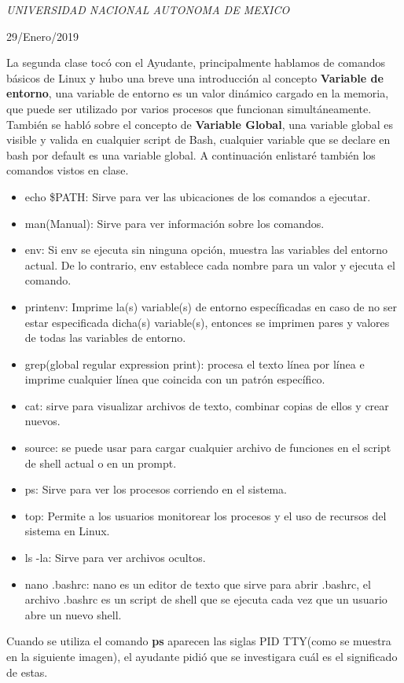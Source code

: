\documentclass[a4paper, 11pt, oneside]{article}
\begin{document}
\begin{titlepage}
	\textit{UNIVERSIDAD NACIONAL AUTONOMA DE MEXICO} 
	
	\vfill
	
	
	
	
	\vspace{0.3\baselineskip} 
	
	29/Enero/2019 
	
	 

\end{titlepage}

La segunda clase tocó con el Ayudante, principalmente hablamos de comandos básicos de Linux y hubo una breve una introducción al concepto \textbf{Variable de entorno}, una variable de entorno es un valor dinámico cargado en la memoria, que puede ser utilizado por varios procesos que funcionan simultáneamente. También se habló sobre el concepto de \textbf{Variable Global}, una variable global es visible y valida en cualquier script de Bash, cualquier variable que se declare en bash por default es una variable global. A continuación enlistaré también los comandos vistos en clase. 

\begin{itemize}
 \item echo \$PATH: Sirve para ver las ubicaciones de los comandos a ejecutar.
 \item man(Manual): Sirve para ver información sobre los comandos.
 \item env: Si env se ejecuta sin ninguna opción, muestra las variables del entorno actual. De lo contrario, env establece cada nombre para un valor y ejecuta el comando.
 \item printenv: Imprime la(s) variable(s) de entorno específicadas en caso de no ser estar especificada dicha(s) variable(s), entonces se imprimen pares y valores de todas las variables de entorno.
 \item grep(global regular expression print): procesa el texto línea por línea e imprime cualquier línea que coincida con un patrón específico.
 \item cat: sirve para visualizar archivos de texto, combinar copias de ellos y crear nuevos.
 \item source: se puede usar para cargar cualquier archivo de funciones en el script de shell actual o en un prompt.
 \item ps: Sirve para ver los procesos corriendo en el sistema.
 \item top: Permite a los usuarios monitorear los procesos y el uso de recursos del sistema en Linux.
 \item ls -la: Sirve para ver archivos ocultos.
 \item nano .bashrc: nano es un editor de texto que sirve para abrir .bashrc, 
el archivo .bashrc es un script de shell que se ejecuta cada vez que un usuario abre un nuevo shell.
\end{itemize}
\newpage
Cuando se utiliza el comando \textbf{ps} aparecen las siglas  PID TTY(como se muestra en la siguiente imagen), el ayudante pidió que se investigara cuál es el significado de estas.
\end{document}
